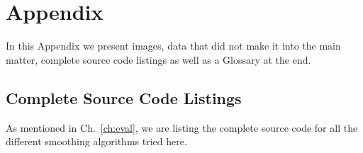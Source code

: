 


\chapter{Appendix}
\label{chap:appendix}
In this Appendix we present images, data that did not make it into the main matter, complete source code listings as well as a Glossary at the end.

\section{Complete Source Code Listings}

As mentioned in Ch.~\ref{ch:eval}, we are listing the complete source code for all the different smoothing algorithms tried here.